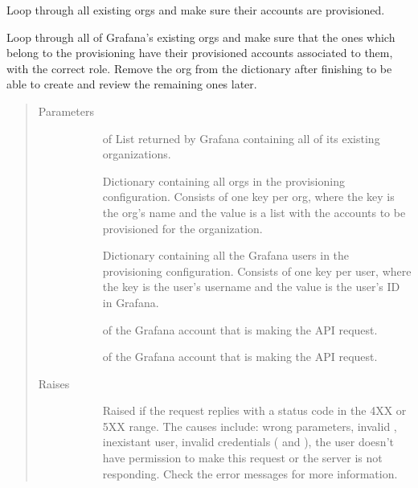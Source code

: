 \documentclass[letterpaper,10pt,english]{sphinxmanual}
\begin{document}
\begin{fulllineitems}
\label{\detokenize{accounts:gpAccounts.reviewExistingOrgs}}
Loop through all existing orgs and make sure their accounts are provisioned.

Loop through all of Grafana’s existing orgs and make sure that the ones which
belong to the provisioning have their provisioned accounts associated to them,
with the correct role. Remove the org from the  dictionary after
finishing to be able to create and review the remaining ones later.
\begin{quote}\begin{description}
\item[{Parameters}] \leavevmode\begin{description}
\item[{}] \leavevmode{[} of \sphinxtitleref{dict}{]}
List returned by Grafana containing all of its existing organizations.

\item[{}] \leavevmode{[}\sphinxtitleref{dict}{]}
Dictionary containing all orgs in the provisioning configuration. Consists
of one key per org, where the key is the org’s name and the value is a list
with the accounts to be provisioned for the organization.

\item[{}] \leavevmode{[}\sphinxtitleref{dict}{]}
Dictionary containing all the Grafana users in the provisioning 
configuration. Consists of one key per user, where the key is the user’s
username and the value is the user’s ID in Grafana.

\item[{}] \leavevmode{[}\sphinxtitleref{str}{]}
 of the Grafana account that is making the API request.

\item[{}] \leavevmode{[}\sphinxtitleref{str}{]}
 of the Grafana account that is making the API request.

\end{description}

\item[{Raises}] \leavevmode\begin{description}
\item[{}] \leavevmode
Raised if the request replies with a status code in the 4XX or 5XX range.
The causes include: wrong parameters, invalid , inexistant user,
invalid credentials ( and ), the user doesn’t have 
permission to make this request or the server is not responding. Check the
error messages for more information.


\end{description}
\end{description}
\end{quote}
\end{fulllineitems}
\end{document}
